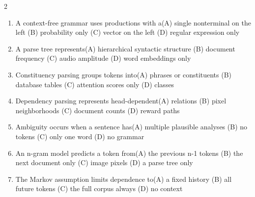 \documentclass[a4paper]{article}
\begin{document}
\begin{multicols*}{2}
\begin{enumerate}
\item A context-free grammar uses productions with a\newline\hspace*{0.6em}(A) single nonterminal on the left \quad (B) probability only \newline\hspace*{0.6em}(C) vector on the left \quad (D) regular expression only
\item A parse tree represents\newline\hspace*{0.6em}(A) hierarchical syntactic structure \quad (B) document frequency \newline\hspace*{0.6em}(C) audio amplitude \quad (D) word embeddings only
\item Constituency parsing groups tokens into\newline\hspace*{0.6em}(A) phrases or constituents \quad (B) database tables \newline\hspace*{0.6em}(C) attention scores only \quad (D) classes
\item Dependency parsing represents head-dependent\newline\hspace*{0.6em}(A) relations \quad (B) pixel neighborhoods \newline\hspace*{0.6em}(C) document counts \quad (D) reward paths
\item Ambiguity occurs when a sentence has\newline\hspace*{0.6em}(A) multiple plausible analyses \quad (B) no tokens \newline\hspace*{0.6em}(C) only one word \quad (D) no grammar
\item An n-gram model predicts a token from\newline\hspace*{0.6em}(A) the previous n-1 tokens \quad (B) the next document only \newline\hspace*{0.6em}(C) image pixels \quad (D) a parse tree only
\item The Markov assumption limits dependence to\newline\hspace*{0.6em}(A) a fixed history \quad (B) all future tokens \newline\hspace*{0.6em}(C) the full corpus always \quad (D) no context

\end{enumerate}
\end{multicols*}
\end{document}
